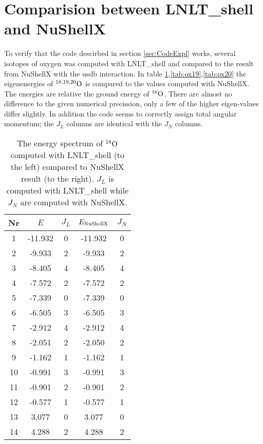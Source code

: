 \section{Comparision between LNLT\_shell and NuShellX}

To verify that the code descirbed in section \ref{sec:CodeExpl} works, several isotopes of oxygen was computed with LNLT\_shell and compared to the result from NuShellX with the usdb interaction. In table \ref{tab:ox18},\ref{tab:ox19},\ref{tab:ox20}
the eigenenergies of \(^{18,19,20}\rm{O}\) is compared to the values computed with NuShellX. The energies are relative the ground energy of \(^{16}\rm{O}\). There are almost no difference to the given numerical precission, only a few of the higher eigen-values differ slightly. In addition the code seems to correctly assign total angular momentum; the \(J_L\) columns are identical with the \(J_N\) columns.

\begin{table}[h]
\caption{The energy spectrum of $^{18}\rm{O}$ computed with LNLT\_shell (to the left) compared to NuShellX result (to the right). \(J_L\) is computed with LNLT\_shell while \(J_N\) are computed with NuShellX.}
\label{tab:ox18}
\begin{tabular}{|c|c|c|c|c|}
\hline Nr & \(E\) & \(J_{L}\) & \(E_{\rm{NuShellX}}\) & \(J_{N}\) \\
\hline 1   & -11.932 &       0 & -11.932 & 0 \\
\hline 2   &  -9.933 &       2 & -9.933 & 2 \\
\hline 3   &  -8.405 &       4 & -8.405 & 4 \\
\hline 4   &  -7.572 &       2 & -7.572 & 2 \\
\hline 5   &  -7.339 &       0 & -7.339 & 0 \\
\hline 6   &  -6.505 &       3 & -6.505 & 3 \\
\hline 7   &  -2.912 &       4 & -2.912 & 4 \\
\hline 8   &  -2.051 &       2 & -2.050 & 2 \\
\hline 9   &  -1.162 &       1 & -1.162 & 1 \\
\hline 10  &  -0.991 &       3 & -0.991 & 3 \\
\hline 11  &  -0.901 &       2 & -0.901 & 2 \\
\hline 12  &  -0.577 &       1 & -0.577 & 1 \\
\hline 13  &   3.077 &       0 & 3.077 & 0 \\
\hline 14  &   4.288 &       2 & 4.288 & 2 \\
\hline
\end{tabular}
\end{table}

